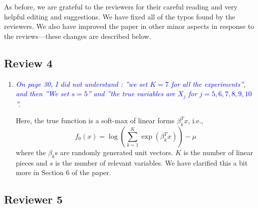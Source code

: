 \documentclass[pdftex,12pt]{article}
\def\rc#1{{\it\textcolor{blue}{#1}}\smallskip}
\begin{document}
\vspace*{5pt}

As before, we are grateful to the reviewers for their careful reading
and very helpful editing and suggestions. We have fixed all of the typos
found by the reviewers. We also have improved the paper in other minor
aspects in response to the reviews---these changes are described
below.

\subsection*{Review 4}


\begin{enumerate}
\item \rc{On page 30, I did not understand : ”we set $K = 7$ for all the experiments”, and then ”We set $s = 5$” and ”the true variables are $X_j$ for $j = 5,6,7,8,9,10$”.}

Here, the true function is a soft-max of linear forms $\beta_k^T x$, i.e., 
$$f_0(x) = \log \left( \sum_{k=1}^K \exp( \beta_k^T x) \right) - \mu$$
where the $\beta_k$s are randomly generated unit vectors. $K$ is the
number of linear pieces and $s$ is the number of relevant
variables. We have clarified this a bit more in Section 6 of the
paper.
\end{enumerate}


\subsection*{Reviewer 5}
\end{document}
